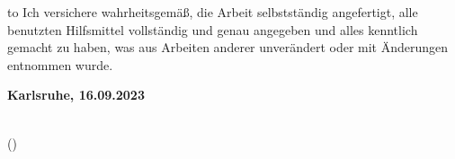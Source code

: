 

\thispagestyle{empty}
\null\vfill
\noindent\hbox to \textwidth{\hrulefill}
%
{Ich versichere wahrheitsgemäß, die Arbeit
selbstständig angefertigt, alle benutzten Hilfsmittel vollständig und genau
angegeben und alles kenntlich gemacht zu haben, was aus Arbeiten anderer
unverändert oder mit Änderungen entnommen wurde.}


\textbf{Karlsruhe, 16.09.2023}
\vspace{1.5cm}

\dotfill\hspace*{8.0cm}\\
\hspace*{2cm}(\theauthor)
\cleardoublepage
